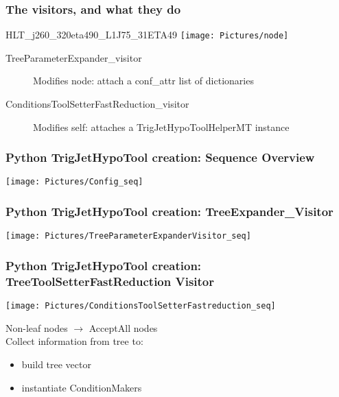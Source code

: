 \documentclass{beamer}
\begin{document}
  
\frame
{
  \frametitle{The visitors, and what they do}
\begin{block}{HLT\_j260\_320eta490\_L1J75\_31ETA49}
 \texttt{[image: Pictures/node]}

 \begin{description}
\item[TreeParameterExpander\_visitor] Modifies  node: attach a conf\_attr list of dictionaries
\end{description}
\end{block}
\begin{block}{}
 \begin{description}
 \item[ConditionsToolSetterFastReduction\_visitor] Modifies self: attaches  a TrigJetHypoToolHelperMT instance
 \end{description}
 \end{block}
 }
 
 \frame
{
  \frametitle{Python TrigJetHypoTool creation: Sequence Overview}
  \begin{block}{}
   \texttt{[image: Pictures/Config\_seq]}
   \end{block}
 }
 
  
 \frame
{
  \frametitle{Python TrigJetHypoTool creation: TreeExpander\_Visitor}
  \begin{block}{}
   \texttt{[image: Pictures/TreeParameterExpanderVisitor\_seq]}
   \end{block}
 }
 
  \frame
{
  \frametitle{Python TrigJetHypoTool creation: TreeToolSetterFastReduction Visitor}
  \begin{block}{}
         \begin{minipage}[T]{0.45\linewidth}
	   \texttt{[image: Pictures/ConditionsToolSetterFastreduction\_seq]}
	 \end{minipage}%
	 \begin{minipage}[T]{0.55\linewidth}
	 Non-leaf nodes $\rightarrow$ AcceptAll nodes\\
	 Collect information from tree to:
	 \begin{itemize}
		\item build tree vector
		\item instantiate ConditionMakers
	\end{itemize}
	 \end{minipage}

   \end{block}
 }

 

 
\end{document}
